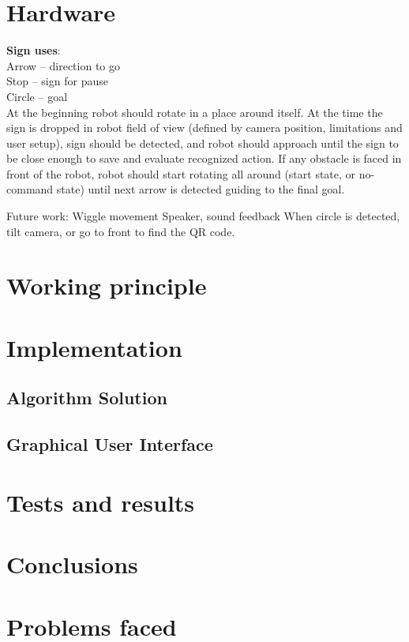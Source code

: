 \documentclass[11pt]{article}
\begin{document}
\clearpage
\clearpage
\section{Hardware}
\textbf{Sign uses}:\\
Arrow – direction to go\\
Stop – sign for pause\\
Circle – goal \\


At the beginning robot should rotate in a place around itself.
At the time the sign is dropped in robot field of view (defined by camera position, limitations and user setup), sign should be detected, and robot should approach until the sign to be close enough to save and evaluate recognized action.
If any obstacle is faced in front of the robot, robot should start rotating all around (start state, or no-command state) until next arrow is detected guiding to the final goal.

Future work:
Wiggle movement
Speaker, sound feedback
When circle is detected, tilt camera, or go to front to find the QR code.


\section{Working principle}

\section{Implementation}


\subsection{Algorithm Solution}


\subsection{Graphical User Interface}




\section{Tests and results}

\section{Conclusions}

\section{Problems faced}


\clearpage
\end{document}
